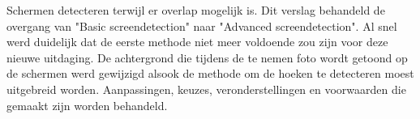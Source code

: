 Schermen detecteren terwijl er overlap mogelijk is. Dit verslag behandeld de overgang van "Basic screendetection" naar "Advanced screendetection". Al snel werd duidelijk dat de eerste methode niet meer voldoende zou zijn voor deze nieuwe uitdaging. De achtergrond die tijdens de te nemen foto wordt getoond op de schermen werd gewijzigd alsook de methode om de hoeken te detecteren moest uitgebreid worden. Aanpassingen, keuzes, veronderstellingen en voorwaarden die gemaakt zijn worden behandeld.
